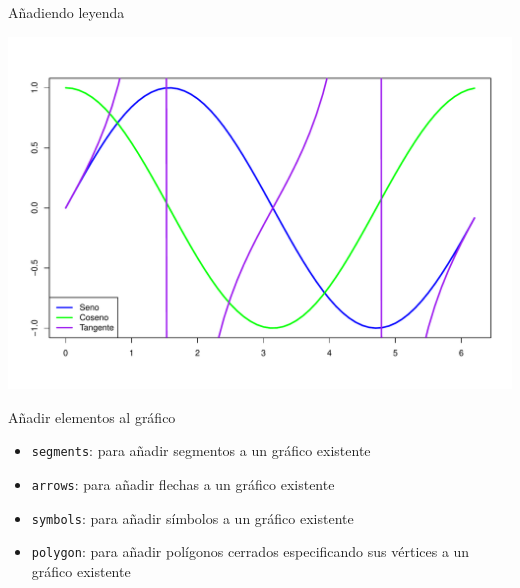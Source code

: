 \documentclass[
  ignorenonframetext,
]{beamer}
\providecommand{\tightlist}{%
  \setlength{\itemsep}{0pt}\setlength{\parskip}{0pt}}
\begin{document}
\begin{frame}{Añadiendo leyenda}
\label{auxf1adiendo-leyenda-1}
\begin{center}\includegraphics[width=0.8\linewidth]{R_base_files/figure-beamer/unnamed-chunk-44-1} \end{center}
\end{frame}

\begin{frame}[fragile]{Añadir elementos al gráfico}
\label{auxf1adir-elementos-al-gruxe1fico-4}
\begin{itemize}
\tightlist
\item
  \texttt{segments}: para añadir segmentos a un gráfico existente
\item
  \texttt{arrows}: para añadir flechas a un gráfico existente
\item
  \texttt{symbols}: para añadir símbolos a un gráfico existente
\item
  \texttt{polygon}: para añadir polígonos cerrados especificando sus
  vértices a un gráfico existente
\end{itemize}
\end{frame}
\end{document}
